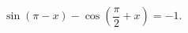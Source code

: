 \begin{ex}[type=equation]
	\begin{condition}
		$\ \sin {\left(\pi -x\right)} -\cos {\left(\dfrac{\pi }{2}+ x\right)} = -1. $
	\end{condition}
\end{ex}
